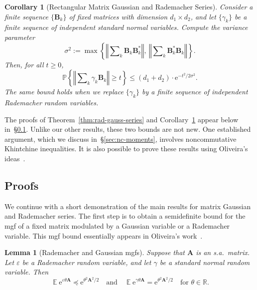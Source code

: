 \documentclass[11pt,letterpaper,twoside,reqno,draft]{amsart}
\newtheorem{cor}[thm]{Corollary}
\newtheorem{lemma}[thm]{Lemma}
\theoremstyle{remark}
\numberwithin{equation}{section}
\numberwithin{thm}{section}
\begin{document}
\begin{cor}[Rectangular Matrix Gaussian and Rademacher Series] \label{cor:rect-rad-gauss-series}
Consider a finite sequence $\{ {\bm{{B}}}_k \}$ of fixed matrices with dimension $d_1 \times d_2$, and let $\{\gamma_k\}$ be a finite sequence of independent standard normal variables.  Compute the variance parameter
\begin{equation*} 
\sigma^2 := \max\left\{ {\left\Vert {{ \sum\nolimits_k {\bm{{B}}}_k {\bm{{B}}}_k^{*} }} \right\Vert}, \
	{\left\Vert {{ \sum\nolimits_k {\bm{{B}}}_k^{*} {\bm{{B}}}_k }} \right\Vert} \right\}.
\end{equation*}
Then, for all $t \geq 0$,
\begin{equation*}
{\mathbb{P}\left\{ {{ {\left\Vert {{ \sum\nolimits_k \gamma_k {\bm{{B}}}_k }} \right\Vert} \geq t}} \right\}}
	\leq (d_1 + d_2) \cdot {\mathrm{e}}^{- t^2 / 2\sigma^2}.
\end{equation*}
The same bound holds when we replace $\{\gamma_k\}$ by a finite sequence of independent Rademacher random variables.
\end{cor}

The proofs of Theorem~\ref{thm:rad-gauss-series} and Corollary~\ref{cor:rect-rad-gauss-series} appear below in~\S\ref{sec:gauss-proof}.  Unlike our other results, these two bounds are not new.  One established argument, which we discuss in~\S\ref{sec:nc-moments}, involves noncommutative Khintchine inequalities.  It is also possible to prove these results using Oliveira's ideas~\cite{Oli10:Sums-Random}.

\subsection{Proofs} \label{sec:gauss-proof}

We continue with a short demonstration of the main results for matrix Gaussian and Rademacher series.  The first step is to obtain a semidefinite bound for the mgf of a fixed matrix modulated by a Gaussian variable or a Rademacher variable.  This mgf bound essentially appears in Oliveira's work~\cite[Lem.~2]{Oli10:Sums-Random}.

\begin{lemma}[Rademacher and Gaussian mgfs] \label{lem:rad-gauss-mgf}
Suppose that ${\bm{{A}}}$ is an s.a.~matrix.  Let ${\varepsilon}$ be a Rademacher random variable, and let $\gamma$ be a standard normal random variable.  Then
$$
{\operatorname{\mathbb{E}}} {\mathrm{e}}^{{\varepsilon} \theta {\bm{{A}}}}
{\preccurlyeq} {\mathrm{e}}^{\theta^2{\bm{{A}}}^2/2}
\quad\text{and}\quad
{\operatorname{\mathbb{E}}} {\mathrm{e}}^{\gamma \theta {\bm{{A}}}}
= {\mathrm{e}}^{\theta^2 {\bm{{A}}}^2/2}
\quad\text{for $\theta \in \mathbb{R}$.}
$$ 
\end{lemma}
\end{document}

